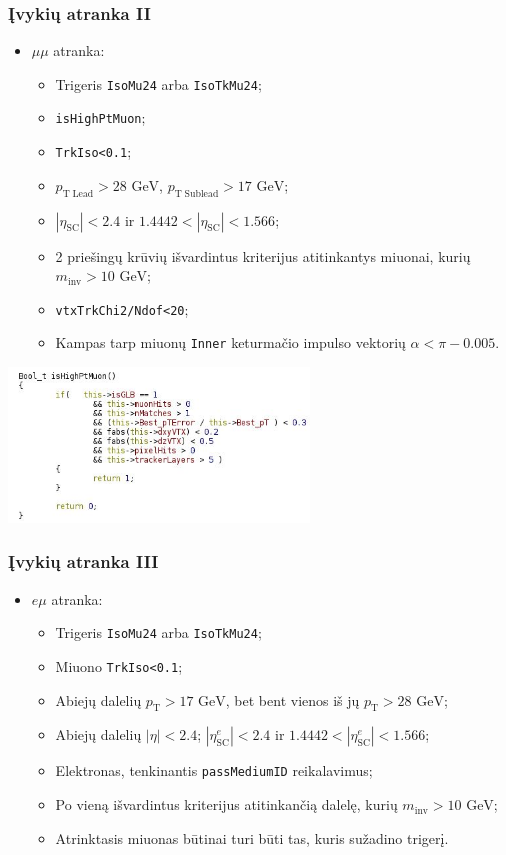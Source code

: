 \documentclass{beamer}
\newcommand{\pT}{\mathit{p}_{\mathrm{T}}}
\newcommand{\etaSC}{\eta_{\mathrm{SC}}}
\newcommand{\pTl}{\mathit{p}_{\mathrm{T\;Lead}}}
\newcommand{\pTsl}{\mathit{p}_{\mathrm{T\;Sublead}}}
\newcommand{\GeV}{$\mathrm{GeV}$}
\newcommand{\emu}{\mathit{e}\mu}
\begin{document}
\begin{frame}
\frametitle{Įvykių atranka II}

\begin{itemize}
	\item $\mu\mu$ atranka:
	\begin{itemize}
		\item Trigeris \texttt{IsoMu24} arba \texttt{IsoTkMu24};
		\item \texttt{isHighPtMuon};
		\item \texttt{TrkIso<0.1}; 
		\item $\pTl>28$ \GeV, $\pTsl>17$ \GeV;
		\item $|\etaSC|<2.4$ ir $1.4442<|\etaSC|<1.566$;
		\item 2 priešingų krūvių išvardintus kriterijus atitinkantys miuonai, kurių $\mathit{m}_{\mathrm{inv}}>10$ \GeV;
		\item \texttt{vtxTrkChi2/Ndof<20};
		\item Kampas tarp miuonų \texttt{Inner} keturmačio impulso vektorių $\alpha<\pi-0.005$.
	\end{itemize}
\end{itemize}

\begin{center}
	\includegraphics[width=0.6\textwidth]{isHighPtMuon.JPG}
\end{center}

\end{frame}


\begin{frame}
\frametitle{Įvykių atranka III}

\begin{itemize}
	\item $\emu$ atranka:
	\begin{itemize}
		\item Trigeris \texttt{IsoMu24} arba \texttt{IsoTkMu24};
		\item Miuono \texttt{TrkIso<0.1}; 
		\item Abiejų dalelių $\pT>17$ \GeV, bet bent vienos iš jų $\pT>28$ \GeV;
		\item Abiejų dalelių $|\eta|<2.4$; $|\etaSC^{\mathit{e}}|<2.4$ ir $1.4442<|\etaSC^{\mathit{e}}|<1.566$;
		\item Elektronas, tenkinantis \texttt{passMediumID} reikalavimus;
		\item Po vieną išvardintus kriterijus atitinkančią dalelę, kurių $\mathit{m}_{\mathrm{inv}}>10$ \GeV;
		\item Atrinktasis miuonas būtinai turi būti tas, kuris sužadino trigerį.
	\end{itemize}
\end{itemize}

\end{frame}
\end{document}
